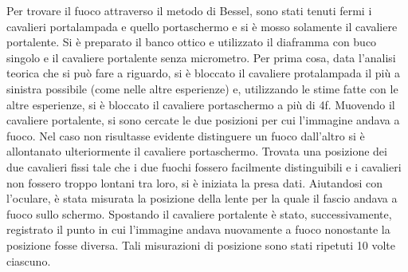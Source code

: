 Per trovare il fuoco attraverso il metodo di Bessel, sono stati 
tenuti fermi i cavalieri portalampada e quello portaschermo e si è 
mosso solamente il cavaliere portalente. Si è preparato il banco 
ottico e utilizzato il diaframma con buco singolo e il cavaliere 
portalente senza micrometro. Per prima cosa, data l'analisi teorica 
che si può fare a riguardo, si è bloccato il cavaliere protalampada 
il più a sinistra possibile (come nelle altre esperienze) e, 
utilizzando le stime fatte con le altre esperienze, si è bloccato il 
cavaliere portaschermo a più di 4f. Muovendo il cavaliere 
portalente, si sono cercate le due posizioni per cui l'immagine 
andava a fuoco. Nel caso non risultasse evidente distinguere un 
fuoco dall'altro si è allontanato ulteriormente il cavaliere 
portaschermo. Trovata una posizione dei due cavalieri fissi tale che 
i due fuochi fossero facilmente distinguibili e i cavalieri non 
fossero troppo lontani tra loro, si è iniziata la presa dati. 
Aiutandosi con l'oculare, è stata misurata la posizione della lente 
per la quale il fascio andava a fuoco sullo schermo. Spostando il 
cavaliere portalente è stato, successivamente, registrato il punto 
in cui l'immagine andava nuovamente a fuoco nonostante la posizione 
fosse diversa. Tali misurazioni di posizione sono stati ripetuti 10 
volte ciascuno.

